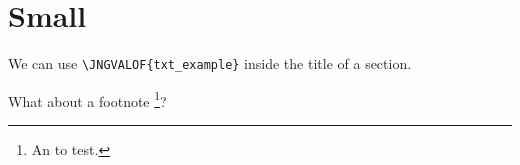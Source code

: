 \documentclass[12pt]{article}
\begin{document}
\section{Small }

We can use \verb#\JNGVALOF{txt_example}# inside the title of a section.

What about a footnote
\footnote{
	An  to test.
}? 
\end{document}
